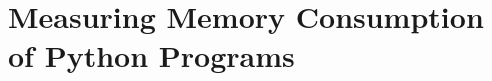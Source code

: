 \chapter{Measuring Memory Consumption of Python Programs}
\label{ch:measuring-memory-consumption}

%
%
%
